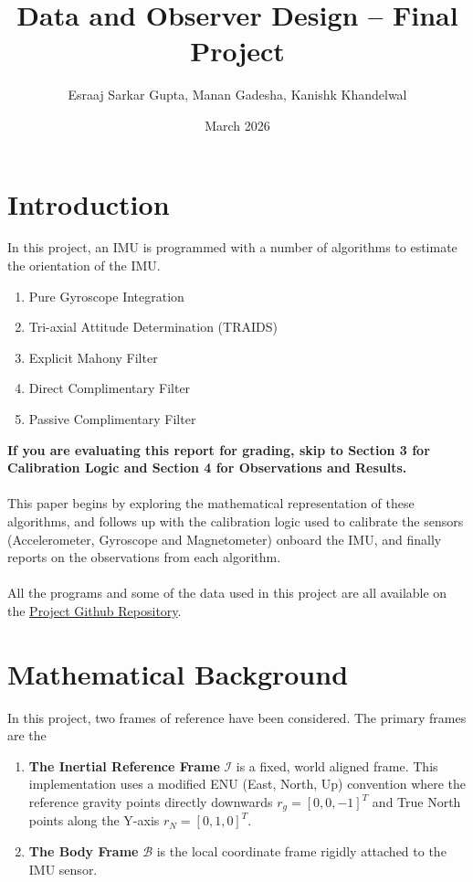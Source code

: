 \documentclass{article}
\title{Data and Observer Design -- Final Project}
\author{Esraaj Sarkar Gupta, Manan Gadesha, Kanishk Khandelwal}
\date{March 2026}
\begin{document}
\maketitle

\section{Introduction}
In this project, an IMU is programmed with a number of algorithms to estimate the orientation of the IMU.

\begin{enumerate}
    \item Pure Gyroscope Integration
    \item Tri-axial Attitude Determination (TRAIDS)
    \item Explicit Mahony Filter
    \item Direct Complimentary Filter
    \item Passive Complimentary Filter
\end{enumerate}

\textbf{If you are evaluating this report for grading, skip to Section 3 for Calibration Logic and Section 4 for Observations and Results.}\\
\\
This paper begins by exploring the mathematical representation of these algorithms, and follows up with the calibration logic used to calibrate the sensors (Accelerometer, Gyroscope and Magnetometer) onboard the IMU, and finally reports on the observations from each algorithm.\\
\\
All the programs and some of the data used in this project are all available on the \href{https://github.com/Esraaj-Sarkar-Gupta/Observer-Design}{Project Github Repository}.

\section{Mathematical Background}
In this project, two frames of reference have been considered. The primary frames are the
\begin{enumerate}
    \item \textbf{The Inertial Reference Frame} $\mathcal{I}$ is a fixed, world aligned frame. This implementation uses a modified ENU (East, North, Up) convention where the reference gravity points directly downwards $r_g = [0,0,-1]^T$ and True North points along the Y-axis $r_N = [0, 1, 0]^T$.
    \item \textbf{The Body Frame} $\mathcal{B}$ is the local coordinate frame rigidly attached to the IMU sensor.
\end{enumerate}
\end{document}
